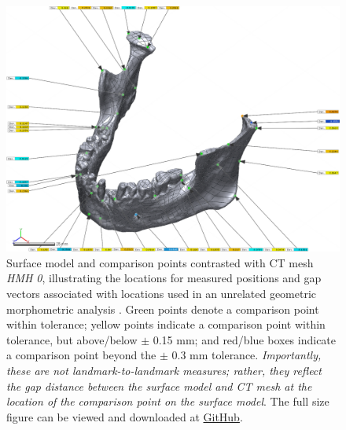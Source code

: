 \documentclass[review]{elsarticle}
\begin{document}
\begin{figure}[!]\centering
\includegraphics[width=\linewidth]{Fig5}
\caption{Surface model and comparison points contrasted with CT mesh \textit{HMH 0}, illustrating the locations for measured positions and gap vectors associated with locations used in an unrelated geometric morphometric analysis \cite[Supplementary Information]{RN11477}. Green points denote a comparison point within tolerance; yellow points indicate a comparison point within tolerance, but above/below $\pm$ 0.15 mm; and red/blue boxes indicate a comparison point beyond the $\pm$ 0.3 mm tolerance. \textit{Importantly, these are not landmark-to-landmark measures; rather, they reflect the gap distance between the surface model and CT mesh at the location of the comparison point on the surface model}. The full size figure can be viewed and downloaded at \href{https://github.com/aksel-blaise/cai.mandible/blob/main/figures/Fig5.png}{GitHub}.}
\label{fig:Fig5}
\end{figure}
\end{document}
